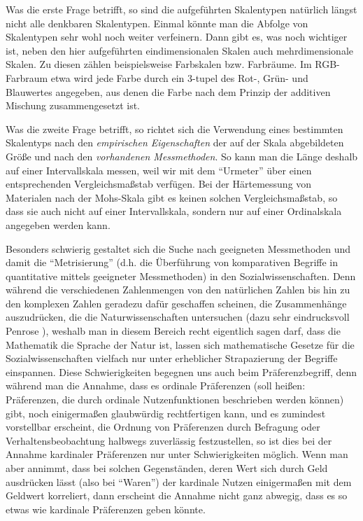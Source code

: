 Was die erste Frage betrifft, so sind die aufgeführten Skalentypen natürlich
längst nicht alle denkbaren Skalentypen. Einmal könnte man die Abfolge von
Skalentypen sehr wohl noch weiter verfeinern. Dann gibt es, was noch wichtiger ist, neben den hier aufgeführten
eindimensionalen Skalen auch mehrdimensionale Skalen. Zu diesen zählen
beispielsweise Farbskalen bzw. Farbräume. Im RGB-Farbraum etwa wird jede Farbe
durch ein 3-tupel des Rot-, Grün- und Blauwertes angegeben, aus denen die Farbe
nach dem Prinzip der additiven Mischung zusammengesetzt ist.

Was die zweite Frage betrifft, so richtet sich
die Verwendung eines bestimmten Skalentyps nach den {\em empirischen
Eigenschaften} der auf der Skala abgebildeten Größe und nach den {\em vorhandenen
Messmethoden}. So kann man die Länge deshalb auf einer Intervallskala messen,
weil wir mit dem "`Urmeter"' über einen entsprechenden Vergleichsmaßstab
verfügen. Bei der Härtemessung von Materialen nach der Mohs-Skala gibt es keinen
solchen Vergleichsmaßstab, so dass sie auch nicht auf einer Intervallskala,
sondern nur auf einer Ordinalskala angegeben werden kann.

Besonders schwierig gestaltet sich die Suche nach geeigneten Messmethoden und
damit die "`Metrisierung"' (d.h. die Überführung von komparativen Begriffe in
quantitative mittels geeigneter Messmethoden) in den Sozialwissenschaften. Denn
während die verschiedenen Zahlenmengen von den natürlichen Zahlen bis hin zu den
komplexen Zahlen geradezu dafür geschaffen scheinen, die Zusammenhänge
auszudrücken, die die Naturwissenschaften untersuchen (dazu sehr eindrucksvoll
Penrose \cite[S. 51ff.]{penrose:2004}), weshalb man in diesem Bereich recht
eigentlich sagen darf, dass die Mathematik die Sprache der Natur ist, lassen sich
mathematische Gesetze für die Sozialwissenschaften vielfach nur unter erheblicher
Strapazierung der Begriffe einspannen. Diese Schwierigkeiten begegnen uns auch
beim Präferenzbegriff, denn während man die Annahme, dass es ordinale Präferenzen
(soll heißen: Präferenzen, die durch ordinale Nutzenfunktionen beschrieben
werden können) gibt, noch einigermaßen glaubwürdig rechtfertigen kann, und es zumindest
vorstellbar erscheint, die Ordnung von Präferenzen durch Befragung oder
Verhaltensbeobachtung halbwegs zuverlässig festzustellen, so ist dies bei der
Annahme kardinaler Präferenzen nur unter Schwierigkeiten möglich. Wenn man aber
annimmt, dass bei solchen Gegenständen, deren Wert sich durch Geld ausdrücken
lässt (also bei "`Waren"') der kardinale Nutzen einigermaßen mit dem Geldwert
korreliert, dann erscheint die Annahme nicht ganz abwegig, dass es so etwas wie
kardinale Präferenzen geben könnte.

